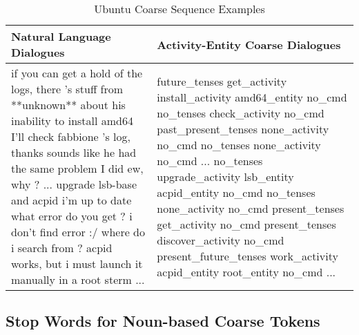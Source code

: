 \documentclass{article}
\begin{document}
\begin{table}[t]
  \caption{Ubuntu Coarse Sequence Examples}
  \label{UbuntuCoarseSeqExamples}
  \centering
  \small
  \begin{tabular}{p{60mm}|p{60mm}}
    Natural Language Dialogues & Activity-Entity Coarse Dialogues \\
    \toprule
if you can get a hold of the logs, there 's stuff from **unknown** about his inability to install amd64
\newline \newline
I'll check fabbione 's log, thanks
sounds like he had the same problem I did
ew, why ?
...
\newline \newline
upgrade lsb-base and acpid
\newline \newline
i'm up to date
\newline \newline
what error do you get ?
\newline \newline
i don't find error :/ where do i search from ?
acpid works, but i must launch it manually in a root sterm
...
&
future\_tenses get\_activity install\_activity amd64\_entity no\_cmd
\newline \newline
no\_tenses check\_activity no\_cmd
past\_present\_tenses none\_activity no\_cmd
no\_tenses none\_activity no\_cmd
...
\newline \newline
no\_tenses upgrade\_activity lsb\_entity acpid\_entity no\_cmd
\newline \newline
no\_tenses none\_activity no\_cmd
\newline \newline
present\_tenses get\_activity no\_cmd
\newline \newline
present\_tenses discover\_activity no\_cmd
present\_future\_tenses work\_activity acpid\_entity root\_entity no\_cmd
... \\
    \bottomrule
  \end{tabular}
\end{table}





\newpage

\subsection*{Stop Words for Noun-based Coarse Tokens}
\end{document}
